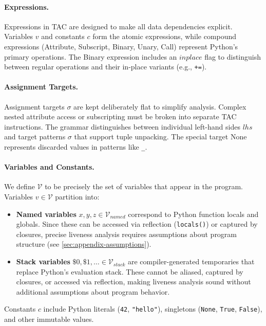 \paragraph{Expressions.}
Expressions in TAC are designed to make all data dependencies explicit. Variables $v$ and constants $c$ form the atomic expressions, while compound expressions (\textsf{Attribute}, \textsf{Subscript}, \textsf{Binary}, \textsf{Unary}, \textsf{Call}) represent Python's primary operations. The \textsf{Binary} expression includes an $inplace$ flag to distinguish between regular operations and their in-place variants (e.g., \texttt{+=}).

\paragraph{Assignment Targets.}
Assignment targets $\sigma$ are kept deliberately flat to simplify analysis. Complex nested attribute access or subscripting must be broken into separate TAC instructions. The grammar distinguishes between individual left-hand sides $lhs$ and target patterns $\sigma$ that support tuple unpacking. The special target \textsf{None} represents discarded values in patterns like \texttt{\_}.

\paragraph{Variables and Constants.}
We define $\mathcal{V}$ to be precisely the set of variables that appear in the program. Variables $v \in \mathcal{V}$ partition into:
\begin{itemize}
    \item \textbf{Named variables} $x,y,z \in \mathcal{V}_{\mathit{named}}$ correspond to Python function locals and globals. Since these can be accessed via reflection (\texttt{locals()}) or captured by closures, precise liveness analysis requires assumptions about program structure (see \autoref{sec:appendix-assumptions}).
    \item \textbf{Stack variables} $\mathsf{\$}0,\mathsf{\$}1,\ldots \in \mathcal{V}_{\mathit{stack}}$ are compiler-generated temporaries that replace Python's evaluation stack. These cannot be aliased, captured by closures, or accessed via reflection, making liveness analysis sound without additional assumptions about program behavior.
\end{itemize}
Constants $c$ include Python literals (\texttt{42}, \texttt{"hello"}), singletons (\texttt{None}, \texttt{True}, \texttt{False}), and other immutable values.

